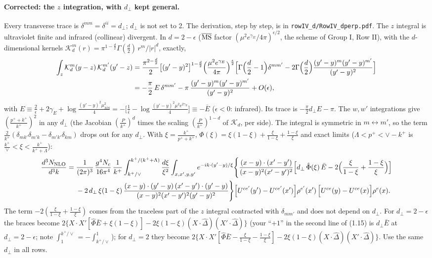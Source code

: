 \documentclass[9pt]{article}
\numberwithin{equation}{section}
\begin{document}
{\color{blue}
\paragraph{Corrected: the $z$ integration, with $d_\perp$ kept general.} Every transverse trace is $\delta^{mm}=\delta^{ii}=d_\perp$; $d_\perp$ is not set to 2. The derivation, step by step, is in \texttt{rowIV\_d/RowIV\_dperp.pdf}. The $z$ integral is ultraviolet finite and infrared (collinear) divergent. In $d=2-\epsilon$ ($\overline{\rm MS}$ factor $(\mu^2e^{\gamma_E}/4\pi)^{\epsilon/2}$, the scheme of Group I, Row II), with the $d$-dimensional kernels $\mathcal K_d^m(r)=\pi^{1-\frac d2}\Gamma(\frac d2)\,r^m/|r|^d$, exactly,
\begin{align}
\int_{z}\mathcal K_d^{m}(y-z)\,\mathcal K_d^{m'}(y'-z)
&=\frac{\pi^{2-\frac d2}}{2}\big[(y'-y)^2\big]^{1-\frac d2}\Big(\frac{\mu^2e^{\gamma_E}}{4\pi}\Big)^{\frac\epsilon2}\Big[\Gamma\Big(\frac d2-1\Big)\delta^{mm'}-2\Gamma\Big(\frac d2\Big)\frac{(y'-y)^{m}(y'-y)^{m'}}{(y'-y)^{2}}\Big]\notag\\
&=-\frac{\pi}{2}\,E\,\delta^{mm'}-\pi\,\frac{(y'-y)^{m}(y'-y)^{m'}}{(y'-y)^{2}}+O(\epsilon),
\end{align}
with $E\equiv\frac{2}{\epsilon}+2\gamma_{E}+\log\frac{(y'-y)^{2}\mu^{2}_{\overline{MS}}}{4}=-\big[\frac{1}{\bar\epsilon}-\log\frac{(y'-y)^{2}\mu^{2}e^{2\gamma_E}}{4}\big]\equiv-\bar E$ ($\epsilon<0$: infrared). Its trace is $-\frac{\pi}{2}d_\perp E-\pi$. The $w,w'$ integrations give $(\frac{p^++k^+}{k^+})^2$ in any $d_\perp$ (the Jacobian $(\frac{P}{k^+})^d$ times the scaling $(\frac{P}{k^+})^{1-d}$ of $\mathcal K_d$, per side). The integral is symmetric in $m\leftrightarrow m'$, so the term $\frac{2}{k^+}(\delta_{mk'}\delta_{m'k}-\delta_{m'k'}\delta_{km})$ drops out for any $d_\perp$. With $\xi=\frac{k^{+}}{p^{+}+k^{+}}$, $\hat\Phi(\xi)=\xi(1-\xi)+\frac{\xi}{1-\xi}+\frac{1-\xi}{\xi}$ and exact limits ($\Lambda<p^{+}<\vee-k^{+}$ is $\frac{k^{+}}{\vee}<\xi<\frac{k^{+}}{k^{+}+\Lambda}$):
\begin{align}
\frac{d^{3}N_{\rm NLO}}{d^{3}k} ={}& \frac{1}{(2\pi)^{3}}\,\frac{g^{4}N_{c}}{16\pi^{4}}\,\frac{1}{k^{+}}\int_{k^{+}/\vee}^{k^{+}/(k^{+}+\Lambda)}\frac{d\xi}{\xi^{2}}\int_{x,x',y,y'}e^{-ik\cdot(y'-y)/\xi}\Bigg\{\frac{(x-y)\cdot(x'-y')}{(x-y)^{2}(x'-y')^{2}}\Big[d_\perp\,\hat\Phi(\xi)\,\bar E-2\Big(\frac{\xi}{1-\xi}+\frac{1-\xi}{\xi}\Big)\Big]\notag\\
&-2\,d_\perp\,\xi(1-\xi)\,\frac{(x-y)\cdot(y'-y)\,(x'-y')\cdot(y'-y)}{(x-y)^{2}(x'-y')^{2}(y'-y)^{2}}\Bigg\}\Big[U^{ce'}(y')-U^{ce'}(x')\Big]\rho^{e'}(x')\,\Big[U^{ce}(y)-U^{ce}(x)\Big]\rho^{e}(x).
\end{align}
The term $-2(\frac{\xi}{1-\xi}+\frac{1-\xi}{\xi})$ comes from the traceless part of the $z$ integral contracted with $\delta_{mm'}$ and does not depend on $d_\perp$. For $d_\perp=2-\epsilon$ the braces become $2\{X\cdot X'[\hat\Phi\bar E+\xi(1-\xi)]-2\xi(1-\xi)(X\cdot\hat\Delta)(X'\cdot\hat\Delta)\}$ (your ``$+1$'' in the second line of (1.15) is $d_\perp\bar E$ at $d_\perp=2-\epsilon$; note $\int_{1}^{k^+/\vee}=-\int_{k^+/\vee}^{1}$); for $d_\perp=2$ they become $2\{X\cdot X'[\hat\Phi\bar E-\frac{\xi}{1-\xi}-\frac{1-\xi}{\xi}]-2\xi(1-\xi)(X\cdot\hat\Delta)(X'\cdot\hat\Delta)\}$. Use the same $d_\perp$ in all rows.
}
\end{document}
